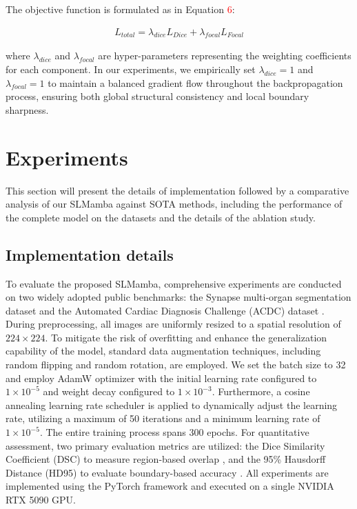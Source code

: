 \documentclass[runningheads]{llncs}
\begin{document}
The objective function is formulated as in Equation \textcolor{red}{6}:

\begin{footnotesize}   
\begin{align}
  L_{total} = \lambda_{dice} L_{Dice} + \lambda_{focal} L_{Focal}
\end{align}
\end{footnotesize}

where $\lambda_{dice}$ and $\lambda_{focal}$ are hyper-parameters representing the weighting coefficients for each component. In our experiments, we empirically set $\lambda_{dice} = 1$ and $\lambda_{focal} = 1$ to maintain a balanced gradient flow throughout the backpropagation process, ensuring both global structural consistency and local boundary sharpness.

\section{Experiments}

This section will present the details of implementation followed by a comparative analysis of our SLMamba against SOTA methods, including the performance of the complete model on the datasets and the details of the ablation study.

\subsection{Implementation details}

To evaluate the proposed SLMamba, comprehensive experiments are conducted on two widely adopted public benchmarks: the Synapse multi-organ segmentation dataset \cite{landman2015miccai} and the Automated Cardiac Diagnosis Challenge (ACDC) dataset \cite{bernard2018deep}. During preprocessing, all images are uniformly resized to a spatial resolution of $224 \times 224$. To mitigate the risk of overfitting and enhance the generalization capability of the model, standard data augmentation techniques, including random flipping and random rotation, are employed. We set the batch size to 32 and employ AdamW optimizer \cite{loshchilov2017decoupled} with the initial learning rate configured to $1 \times 10^{-5}$ and weight decay configured to $1 \times 10^{-3}$. Furthermore, a cosine annealing learning rate scheduler \cite{loshchilov2016sgdr} is applied to dynamically adjust the learning rate, utilizing a maximum of 50 iterations and a minimum learning rate of $1 \times 10^{-5}$. The entire training process spans 300 epochs. For quantitative assessment, two primary evaluation metrics are utilized: the Dice Similarity Coefficient (DSC) to measure region-based overlap \cite{milletari2016v}, and the 95\% Hausdorff Distance (HD95) to evaluate boundary-based accuracy \cite{huttenlocher1993comparing}. All experiments are implemented using the PyTorch framework and executed on a single NVIDIA RTX 5090 GPU.
\end{document}
